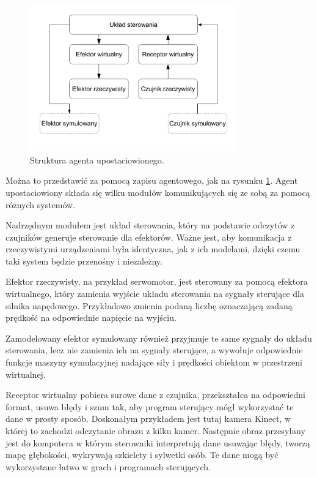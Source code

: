 \begin{figure}[H]
\centering
 \includegraphics[width=0.8\textwidth]{graphics/agent.pdf}
\caption{Struktura agenta upostaciowionego.}
\label{fig:agent}
\end{figure} 

Można to przedstawić za pomocą zapisu agentowego, jak na rysunku \ref{fig:agent}.
Agent upostaciowiony składa się wilku modułów komunikujących się ze sobą za pomocą różnych systemów.

Nadrzędnym modułem jest układ sterowania, który na podstawie odczytów z czujników generuje sterowanie dla efektorów.
Ważne jest, aby komunikacja z rzeczywistymi urządzeniami była identyczna, jak z ich modelami, dzięki czemu taki system będzie przenośny i niezależny.

Efektor rzeczywisty, na przykład serwomotor, jest sterowany za pomocą efektora wirtualnego, który zamienia wyjście układu sterowania na sygnały sterujące dla silnika napędowego.
Przykładowo zmienia podaną liczbę oznaczającą zadaną prędkość na odpowiednie napięcie na wyjściu.

Zamodelowany efektor symulowany również przyjmuje te same sygnały do układu sterowania, lecz nie zamienia ich na sygnały sterujące, a wywołuje odpowiednie funkcje maszyny symulacyjnej nadające siły i prędkości obiektom w przestrzeni wirtualnej.

Receptor wirtualny pobiera surowe dane z czujnika, przekształca na odpowiedni format, usuwa błędy i szum tak, aby program sterujący mógł wykorzystać te dane w prosty sposób. 
Doskonałym przykładem jest tutaj kamera Kinect, w której to zachodzi odczytanie obrazu z kilku kamer.
Następnie obraz przesyłany jest do komputera w którym sterowniki interpretują dane usuwając błędy, tworzą mapę głębokości, wykrywają szkielety i sylwetki osób.
Te dane mogą być wykorzystane łatwo w grach i programach sterujących.

